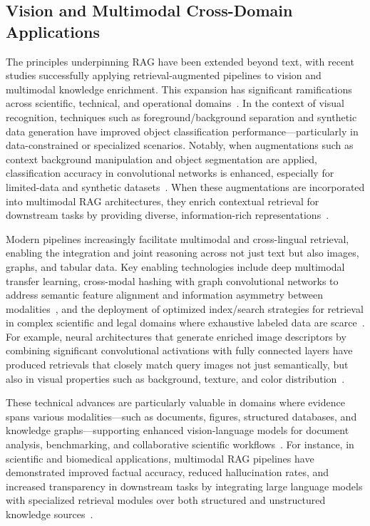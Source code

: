 \documentclass[sigconf]{acmart}
\begin{document}
\subsection{Vision and Multimodal Cross-Domain Applications}

The principles underpinning RAG have been extended beyond text, with recent studies successfully applying retrieval-augmented pipelines to vision and multimodal knowledge enrichment. This expansion has significant ramifications across scientific, technical, and operational domains~\cite{ref3,ref5,ref14,ref15,ref20,ref21,ref23,ref24,ref28,ref29,ref30,ref31,ref33,ref36,ref37,ref38,ref39,ref40,ref43,ref45,ref48,ref52,ref54,ref55,ref61,ref62}. In the context of visual recognition, techniques such as foreground/background separation and synthetic data generation have improved object classification performance—particularly in data-constrained or specialized scenarios. Notably, when augmentations such as context background manipulation and object segmentation are applied, classification accuracy in convolutional networks is enhanced, especially for limited-data and synthetic datasets~\cite{ref62}. When these augmentations are incorporated into multimodal RAG architectures, they enrich contextual retrieval for downstream tasks by providing diverse, information-rich representations~\cite{ref62}.

Modern pipelines increasingly facilitate multimodal and cross-lingual retrieval, enabling the integration and joint reasoning across not just text but also images, graphs, and tabular data. Key enabling technologies include deep multimodal transfer learning, cross-modal hashing with graph convolutional networks to address semantic feature alignment and information asymmetry between modalities~\cite{ref20}, and the deployment of optimized index/search strategies for retrieval in complex scientific and legal domains where exhaustive labeled data are scarce~\cite{ref14,ref15,ref61,ref62}. For example, neural architectures that generate enriched image descriptors by combining significant convolutional activations with fully connected layers have produced retrievals that closely match query images not just semantically, but also in visual properties such as background, texture, and color distribution~\cite{ref21}. 

These technical advances are particularly valuable in domains where evidence spans various modalities—such as documents, figures, structured databases, and knowledge graphs—supporting enhanced vision-language models for document analysis, benchmarking, and collaborative scientific workflows~\cite{ref5,ref14,ref28,ref29,ref30,ref31,ref33,ref36,ref37,ref38,ref39,ref40,ref43,ref45,ref48,ref54,ref55}. For instance, in scientific and biomedical applications, multimodal RAG pipelines have demonstrated improved factual accuracy, reduced hallucination rates, and increased transparency in downstream tasks by integrating large language models with specialized retrieval modules over both structured and unstructured knowledge sources~\cite{ref5,ref29,ref48,ref52,ref54,ref55}. 
\end{document}
